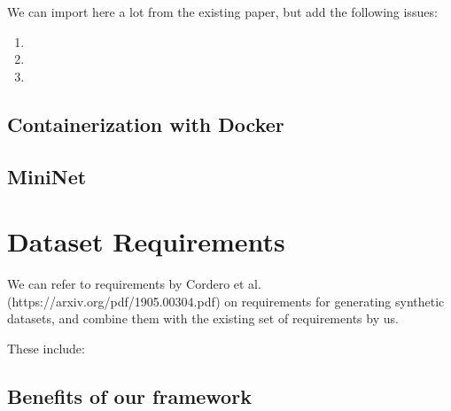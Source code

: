\documentclass[sigconf]{acmart}
\begin{document}
We can import here a lot from the existing paper, but add the following issues:

\begin{enumerate}

\item 

\item 

\item 

\end{enumerate}


\subsection{Containerization with Docker}

\subsection{MiniNet}



\section{Dataset Requirements}\label{Sec:require}



We can refer to requirements by Cordero et al. (https://arxiv.org/pdf/1905.00304.pdf) on requirements for generating synthetic datasets, and combine them with the existing set of requirements by us. 

These include:




\subsection{Benefits of our framework}
\end{document}
